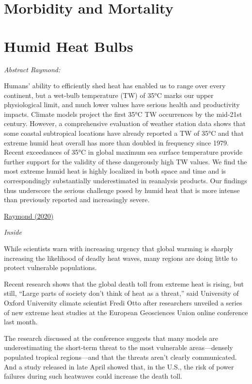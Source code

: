 \documentclass[
]{book}
\begin{document}
\hypertarget{morbidity-and-mortality}{%
\section{Morbidity and Mortality}\label{morbidity-and-mortality}}

\hypertarget{humid-heat-bulbs}{%
\section{Humid Heat Bulbs}\label{humid-heat-bulbs}}

\emph{Abstract Raymond:}

Humans' ability to efficiently shed heat has enabled us to range over every continent,
but a wet-bulb temperature (TW) of 35°C marks our upper physiological limit,
and much lower values have serious health and productivity impacts.
Climate models project the first 35°C TW occurrences by the mid-21st century.
However, a comprehensive evaluation of weather station data shows that
some coastal subtropical locations have already reported a TW of 35°C and
that extreme humid heat overall has more than doubled in frequency since 1979.
Recent exceedances of 35°C in global maximum sea surface temperature provide further
support for the validity of these dangerously high TW values.
We find the most extreme humid heat is highly localized in both space and time and
is correspondingly substantially underestimated in reanalysis products.
Our findings thus underscore the serious challenge posed by humid heat
that is more intense than previously reported and increasingly severe.

\href{https://advances.sciencemag.org/content/6/19/eaaw1838}{Raymond (2020)}

\emph{Inside}

While scientists warn with increasing urgency that global warming is sharply increasing the likelihood of deadly heat waves, many regions are doing little to protect vulnerable populations.

Recent research shows that the global death toll from extreme heat is rising, but still, ``Large parts of society don't think of heat as a threat,'' said University of Oxford University climate scientist Fredi Otto after researchers unveiled a series of new extreme heat studies at the European Geosciences Union online conference last month.

The research discussed at the conference suggests that many models are underestimating the short-term threat to the most vulnerable areas---densely populated tropical regions---and that the threats aren't clearly communicated. And a study released in late April showed that, in the U.S., the risk of power failures during such heatwaves could increase the death toll.
\end{document}
